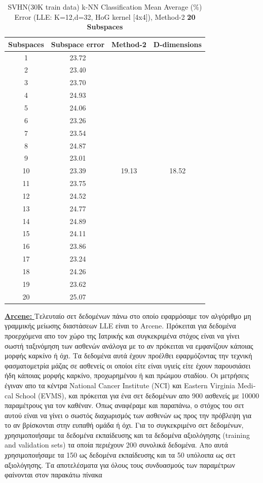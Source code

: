 \begin{table}[H]
\centering
\label{tab:table18}
\begin{tabular}{|c|c|c|c|}
\hline
\textlatin{Subspaces} & \textlatin{Subspace error} & \textlatin{Method-2} & \textlatin{D-dimensions}  \\
\hline
1 & 23.72 & & \\
2 & 23.40 & & \\
3 & 23.70 & & \\
4 & 24.93 & & \\
5 & 24.06 & & \\
6 & 23.26 & & \\
7 & 23.54 &  & \\
8 & 24.87 & & \\
9 & 23.01 &  & \\
10 & 23.39 & 19.13 & 18.52 \\
11 & 23.75 & & \\
12 & 24.52 &  & \\
13 & 24.77 &  & \\
14 & 24.89 & & \\
15 & 24.11 & & \\
16 & 23.86 & & \\
17 & 23.24 &  & \\
18 & 24.26 & & \\
19 & 23.62 &  & \\
20 & 25.07 &  & \\
\hline
\end{tabular}
\caption{\textlatin{SVHN(30K train data) k-NN Classification Mean Average (\%) Error (LLE: K=12,d=32, HoG kernel [4x4]), Method-2 \textbf{20 Subspaces}}}
\end{table}

\par
\href{http://archive.ics.uci.edu/ml/datasets/Arcene}{\textbf{\textlatin{Arcene: }}} Τελευταίο σετ δεδομένων πάνω στο οποίο εφαρμόσαμε τον αλγόριθμο μη γραμμικής μείωσης διαστάσεων \textlatin{LLE} είναι το \textlatin{Arcene}. Πρόκειται για δεδομένα προερχόμενα απο τον χώρο της Ιατρικής και συγκεκριμένα στόχος είναι να γίνει σωστή ταξινόμηση των ασθενών ανάλογα με το αν πρόκειται να εμφανίζουν κάποιας μορφής καρκίνο ή όχι. Τα δεδομένα αυτά έχουν προέλθει εφαρμόζοντας την τεχνική φασματομετρία μάζας σε ασθενείς οι οποίοι είτε είναι υγιείς είτε έχουν παρουσιάσει ήδη κάποιας μορφής καρκίνο, προχωρημένου ή και πρώιμου σταδίου. Οι μετρήσεις έγιναν απο τα κέντρα \textlatin{National Cancer Institute (NCI)} και \textlatin{ Eastern Virginia Medical School (EVMS)}, και πρόκειται για ένα σετ δεδομένων απο 900 ασθενείς με 10000 παραμέτρους για τον καθέναν. Όπως αναφέραμε και παραπάνω, ο στόχος του σετ αυτού είναι να γίνει ο σωστός διαχωρισμός των ασθενών ως προς την πρόβλεψη για το αν βρίσκονται στην ευπαθή ομάδα ή όχι. Για το συγκεκριμένο σετ δεδομένων, χρησιμοποιήσαμε τα δεδομένα εκπαίδευσης και τα δεδομένα αξιολόγησης (\textlatin{training and validation sets}) τα οποία περιέχουν 200 συνολικά δεδομένα. Απο αυτά χρησιμοποιήσαμε τα 150 ως δεδομένα εκπαίδευσης και τα 50 υπόλοιπα ως σετ αξιολόγησης. Τα αποτελέσματα για όλους τους συνδυασμούς των παραμέτρων φαίνονται στον παρακάτω πίνακα

